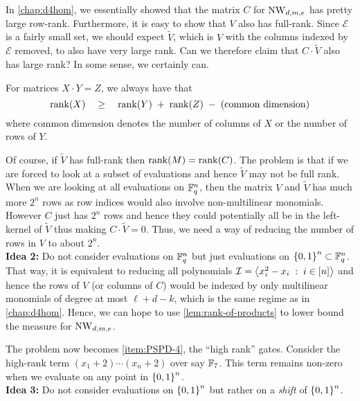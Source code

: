 In \autoref{chap:d4hom}, we essentially showed that the matrix $C$ for $\operatorname{\mathrm{NW}}_{d,m,e}$ has pretty large row-rank.
Furthermore, it is easy to show that $V$ also has full-rank.
Since $\mathcal{E}$ is a fairly small set, we should expect $\tilde{V}$, which is $V$ with the columns indexed by $\mathcal{E}$ removed, to also have very large rank.
Can we therefore claim that $C \cdot \tilde{V}$ also has large rank?
In some sense, we  certainly can.

\begin{lemma}\label{lem:rank-of-products}
For matrices $X \cdot Y = Z$, we always have that
\[
\operatorname{rank}(X) \quad \geq \quad \operatorname{rank}(Y) \;+\; \operatorname{rank}(Z) \;-\; (\mathrm{common\ dimension})
\]
where $\mathrm{common\ dimension}$ denotes the number of columns of $X$ or the number of rows of $Y$. 
\end{lemma}

Of course, if $\tilde{V}$ has full-rank then $\operatorname{rank}(M) = \operatorname{rank}(C)$.
The problem is that if we are forced to look at a subset of evaluations and hence $\tilde{V}$ may not be full rank.
When we are looking at all evaluations on $\mathbb{F}_q^n$, then the matrix $V$ and $\tilde{V}$ has much more $2^n$ rows as row indices would also involve non-multilinear monomials.
However $C$ just has $2^n$ rows and hence they could potentially all be in the left-kernel of $\tilde{V}$ thus making $C \cdot \tilde{V} = 0$.
Thus, we need a way of reducing the number of rows in $V$ to about $2^n$.
\\

{\bf Idea 2:} Do not consider evaluations on $\mathbb{F}_q^n$ but just evaluations on $\left\{0,1\right\}^n \subset \mathbb{F}_q^n$. \\

\noindent
That way, it is equivalent to reducing all polynomials $\mathcal{I} = \left\langle x_i^2 - x_i \;:\;i\in [n]\right\rangle$ and hence the rows of $V$ (or columns of $C$) would be indexed by only multilinear monomials of degree at most $\ell+d-k$, which is the same regime as in \autoref{chap:d4hom}.
Hence, we can hope to use \autoref{lem:rank-of-products} to lower bound the measure for $\operatorname{\mathrm{NW}}_{d,m,e}$.

The problem now becomes \autoref{item:PSPD-4}, the ``high rank'' gates.
Consider the high-rank term $(x_1 + 2) \cdots (x_n + 2)$ over say $\mathbb{F}_7$.
This term remains non-zero when we evaluate on any point in $\left\{0,1\right\}^n$.\\

{\bf Idea 3:} Do not consider evaluations on $\left\{0,1\right\}^n$ but rather on a \emph{shift} of $\left\{0,1\right\}^n$. \\

